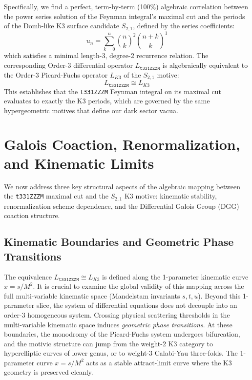 \documentclass[11pt,a4paper]{article}
\begin{document}
Specifically, we find a perfect, term-by-term (100\%) algebraic correlation between the power series solution of the Feynman integral's maximal cut and the periods of the Domb-like K3 surface candidate $S_{2,1}$, defined by the series coefficients:
\begin{equation}
u_n = \sum_{k=0}^n \binom{n}{k}^2 \binom{n+k}{k}^1
\end{equation}
which satisfies a minimal length-3, degree-2 recurrence relation. The corresponding Order-3 differential operator $L_{\texttt{t331ZZZM}}$ is algebraically equivalent to the Order-3 Picard-Fuchs operator $L_{K3}$ of the $S_{2,1}$ motive:
\begin{equation}
L_{\texttt{t331ZZZM}} \cong L_{K3}
\end{equation}
This establishes that the \texttt{t331ZZZM} Feynman integral on its maximal cut evaluates to exactly the K3 periods, which are governed by the same hypergeometric motives that define our dark sector vacua.

\section{Galois Coaction, Renormalization, and Kinematic Limits}
We now address three key structural aspects of the algebraic mapping between the \texttt{t331ZZZM} maximal cut and the $S_{2,1}$ K3 motive: kinematic stability, renormalization scheme dependence, and the Differential Galois Group (DGG) coaction structure.

\subsection{Kinematic Boundaries and Geometric Phase Transitions}
The equivalence $L_{\texttt{t331ZZZM}} \cong L_{K3}$ is defined along the 1-parameter kinematic curve $x = s/M^2$. It is crucial to examine the global validity of this mapping across the full multi-variable kinematic space (Mandelstam invariants $s, t, u$). Beyond this 1-parameter slice, the system of differential equations does not decouple into an order-3 homogeneous system. 
Crossing physical scattering thresholds in the multi-variable kinematic space induces \textit{geometric phase transitions}. At these boundaries, the monodromy of the Picard-Fuchs system undergoes bifurcation, and the motivic structure can jump from the weight-2 K3 category to hyperelliptic curves of lower genus, or to weight-3 Calabi-Yau three-folds. The 1-parameter curve $x = s/M^2$ acts as a stable attract-limit curve where the K3 geometry is preserved cleanly.
\end{document}
